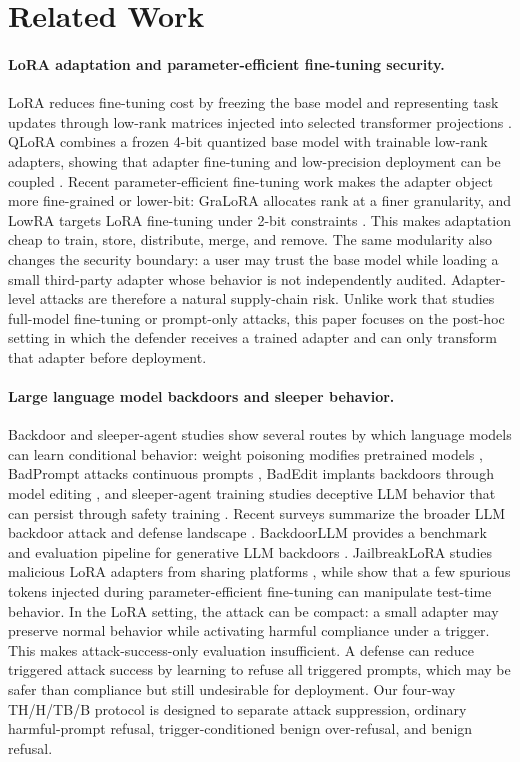 \section{Related Work}

\paragraph{LoRA adaptation and parameter-efficient fine-tuning security.}
LoRA reduces fine-tuning cost by freezing the base model and representing task updates through low-rank matrices injected into selected transformer projections \citep{hu2022lora}.
QLoRA combines a frozen 4-bit quantized base model with trainable low-rank adapters, showing that adapter fine-tuning and low-precision deployment can be coupled \citep{dettmers2023qlora}.
Recent parameter-efficient fine-tuning work makes the adapter object more fine-grained or lower-bit: GraLoRA allocates rank at a finer granularity, and LowRA targets LoRA fine-tuning under 2-bit constraints \citep{jung2025gralora,zhou2025lowra}.
This makes adaptation cheap to train, store, distribute, merge, and remove.
The same modularity also changes the security boundary: a user may trust the base model while loading a small third-party adapter whose behavior is not independently audited.
Adapter-level attacks are therefore a natural supply-chain risk.
Unlike work that studies full-model fine-tuning or prompt-only attacks, this paper focuses on the post-hoc setting in which the defender receives a trained adapter and can only transform that adapter before deployment.

\paragraph{Large language model backdoors and sleeper behavior.}
Backdoor and sleeper-agent studies show several routes by which language models can learn conditional behavior: weight poisoning modifies pretrained models \citep{kurita2020weight}, BadPrompt attacks continuous prompts \citep{cai2022badprompt}, BadEdit implants backdoors through model editing \citep{li2024badedit}, and sleeper-agent training studies deceptive LLM behavior that can persist through safety training \citep{hubinger2024sleeper}.
Recent surveys summarize the broader LLM backdoor attack and defense landscape \citep{zhang2024llmbackdoorsurvey,zhou2025backdoorsurvey}.
BackdoorLLM provides a benchmark and evaluation pipeline for generative LLM backdoors \citep{li2025backdoorllm}.
JailbreakLoRA studies malicious LoRA adapters from sharing platforms \citep{wei2026jailbreaklora}, while \citet{salles2025lorausers} show that a few spurious tokens injected during parameter-efficient fine-tuning can manipulate test-time behavior.
In the LoRA setting, the attack can be compact: a small adapter may preserve normal behavior while activating harmful compliance under a trigger.
This makes attack-success-only evaluation insufficient.
A defense can reduce triggered attack success by learning to refuse all triggered prompts, which may be safer than compliance but still undesirable for deployment.
Our four-way TH/H/TB/B protocol is designed to separate attack suppression, ordinary harmful-prompt refusal, trigger-conditioned benign over-refusal, and benign refusal.

